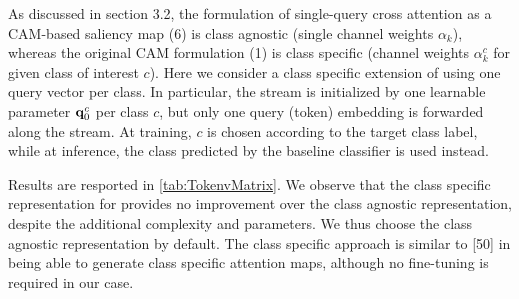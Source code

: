 As discussed in section 3.2, the formulation of single-query cross attention as a CAM-based saliency map (6) is class agnostic (single channel weights $\alpha_k$), whereas the original CAM formulation (1) is class specific (channel weights $\alpha_k^c$ for given class of interest $c$). 
Here we consider a class specific extension of \Ours using one query vector per class. 
In particular, the stream is initialized by one learnable parameter $\mathbf{q}_0^c$ per class $c$, but only one query (\cls token) embedding is forwarded along the stream. At training, $c$ is chosen according to the target class label, while at inference, the class predicted by the baseline classifier is used instead.


Results are resported in \autoref{tab:TokenvMatrix}. We observe that the class specific representation for \Ours provides no improvement over the class agnostic representation, despite the additional complexity and parameters. We thus choose the class agnostic representation by default. The class specific approach is similar to [50] in being able to generate class specific attention maps, although no fine-tuning is required in our case. 





